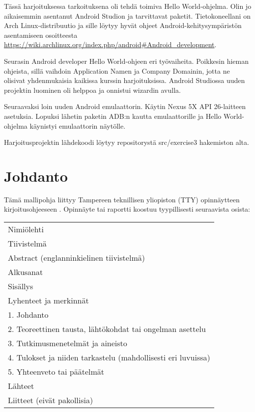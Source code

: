 \documentclass[globalnumbering,centeredcaptions,draftfooter]{tutthesis/tutthesis} %
\begin{document}
Tässä harjoituksessa tarkoituksena oli tehdä toimiva Hello World-ohjelma. Olin jo aikaisemmin asentanut Android Studion ja tarvittavat paketit. Tietokoneellani on Arch Linux-distribuutio ja sille löytyy hyvät ohjeet Android-kehitysympäristön asentamiseen osoitteesta \url{https://wiki.archlinux.org/index.php/android#Android_development}.

Seurasin Android developer Hello World-ohjeen eri työvaiheita. Poikkesin hieman ohjeista, sillä vaihdoin Application Namen ja Company Domainin, jotta ne olisivat yhdenmukaisia kaikissa kurssin harjoituksissa. Android Studiossa uuden projektin luominen oli helppoa ja onnistui wizardin avulla.

Seuraavaksi loin uuden Android emulaattorin. Käytin Nexus 5X API 26-laitteen asetuksia. Lopuksi lähetin paketin ADB:n kautta emulaattorille ja Hello World-ohjelma käynistyi emulaattorin näytölle.

Harjoitusprojektin lähdekoodi löytyy repositorystä src/exercise3 hakemiston alta.


\chapter{Johdanto}
\label{ch:johdanto}

Tämä mallipohja liittyy Tampereen teknillisen yliopiston (TTY) opinnäytteen kirjoitusohjeeseen \citep{Tty2017}.
Opinnäyte tai raportti koostuu tyypillisesti seuraavista osista:

\begin{tabular}[h]{l}
Nimiölehti\\
Tiivistelmä\\
Abstract (englanninkielinen tiivistelmä)\\
Alkusanat\\
Sisällys\\
Lyhenteet ja merkinnät\\
1. Johdanto\\
2. Teoreettinen tausta, lähtökohdat tai ongelman asettelu \\
3. Tutkimusmenetelmät ja aineisto \\
4. Tulokset ja niiden tarkastelu (mahdollisesti eri luvuissa)\\
5. Yhteenveto tai päätelmät\\
Lähteet\\
Liitteet (eivät pakollisia)\\
\end{tabular}
\end{document}
